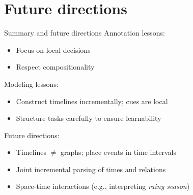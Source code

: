 \documentclass[12pt,compress]{beamer}
\begin{document}
\section{Future directions}


\begin{frame}{Summary and future directions}
Annotation lessons:
\begin{itemize}
\item Focus on local decisions
\item Respect compositionality
\end{itemize}

\pause
Modeling lessons:
\begin{itemize}
\item Construct timelines incrementally; cues are local
\item Structure tasks carefully to ensure learnability
\end{itemize}

\pause
\bigskip
Future directions:
\begin{itemize}
\item Timelines $\neq$ graphs; place events in time intervals
\item Joint incremental parsing of times and relations
\item Space-time interactions (e.g., interpreting \textit{rainy season})
\end{itemize}
\end{frame}
\end{document}
